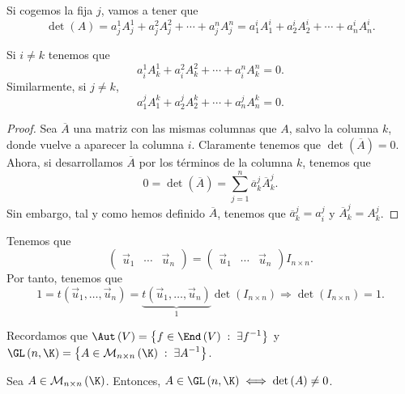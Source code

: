 Si cogemos la fija $\displaystyle j $, vamos a tener que 
\[\det\left(A\right) = a^{1}_{j}A^{1}_{j}+a^{2}_{j}A^{2}_{j}+\cdots+a^{n}_{j}A^{n}_{j} = a^{i}_{1}A^{i}_{1} + a^{i}_{2}A^{i}_{2} + \cdots + a^{i}_{n}A^{i}_{n} .\]
\begin{fprop}[]
\normalfont 
Si $\displaystyle i\neq k $ tenemos que
\[a^{1}_{i}A^{1}_{k} + a^{2}_{i}A^{2}_{k} + \cdots + a^{n}_{i}A^{n}_{k} = 0 .\]
Similarmente, si $\displaystyle j \neq k $,
\[a^{j}_{1}A^{k}_{1} + a^{j}_{2}A^{k}_{2} + \cdots + a^{j}_{n}A^{k}_{n} = 0 .\]
\end{fprop}

\begin{proof}
Sea $\displaystyle \overline{A} $ una matriz con las mismas columnas que $\displaystyle A $, salvo la columna $\displaystyle k $, donde vuelve a aparecer la columna $\displaystyle i $. Claramente tenemos que $\displaystyle \det\left( \overline{A}\right) = 0 $. Ahora, si desarrollamos $\displaystyle \overline{A} $ por los términos de la columna $\displaystyle k $, tenemos que
\[0 = \det\left( \overline{A}\right) = \sum^{n}_{j=1}\overline{a}^{j}_{k} \overline{A}^{j}_{k} .\]
Sin embargo, tal y como hemos definido $\displaystyle \overline{A} $, tenemos que $\displaystyle \overline{a}^{j}_{k} = a^{j}_{i} $ y $\displaystyle \overline{A}^{j}_{k} = A^{j}_{k} $.
\end{proof}

Tenemos que 
\[\begin{pmatrix} \vec{u}_{1} & \cdots & \vec{u}_{n} \end{pmatrix} = \begin{pmatrix} \vec{u}_{1} & \cdots & \vec{u}_{n} \end{pmatrix} I_{n\times n} .\]
Por tanto, tenemos que
\[1 = t\left(\vec{u}_{1}, \ldots, \vec{u}_{n}\right) = \underbrace{t\left(\vec{u}_{1}, \ldots, \vec{u}_{n}\right)}_{1}\det \left(I_{n \times n}\right) \Rightarrow \det\left(I_{ n \times n}\right) = 1 .\]

Recordamos que $\displaystyle \Aut\left(V\right) = \left\{ f \in \End\left(V\right) \; : \; \exists f^{-1}\right\}  $ y $\displaystyle \GL\left(n, \K\right) = \left\{ A \in \mathcal{M}_{n \times n}\left(\K\right) \; : \; \exists A^{-1}\right\}  $.
\begin{ftheorem}[]
\normalfont Sea $\displaystyle A \in \mathcal{M}_{ n \times n}\left(\K\right) $. Entonces, $\displaystyle A \in \GL\left(n, \K\right) \iff \det\left(A\right) \neq 0 $.
\end{ftheorem}

